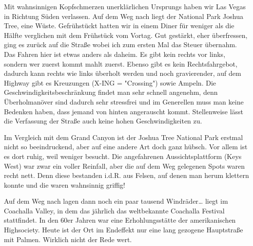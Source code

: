 Mit wahnsinnigen Kopfschmerzen unerklärlichen Ursprungs haben wir Las Vegas in Richtung Süden verlassen.
Auf dem Weg nach  liegt der National Park Joshua Tree, eine Wüste.
Gefrühstückt hatten wir in einem Diner für weniger als die Hälfte verglichen mit dem Frühstück vom Vortag.
Gut gestärkt, eher überfressen, ging es zurück auf die Straße wobei ich zum ersten Mal das Steuer übernahm.
Das Fahren hier ist etwas anders als daheim. Es gibt kein rechts vor links, sondern wer zuerst kommt mahlt zuerst.
Ebenso gibt es kein Rechtsfahrgebot, dadurch kann rechts wie links überholt werden und noch gravierender, auf dem Highway gibt es Kreuzungen (X-ING = "Crossing") sowie Ampeln.
Die Geschwindigkeitsbeschränkung findet man sehr schnell angenehm, denn Überholmanöver sind dadurch sehr stressfrei und im Generellen muss man keine Bedenken haben, dass jemand von hinten angerauscht kommt.
Stellenweise lässt die Verfassung der Straße auch keine hohen Geschwindigkeiten zu.

Im Vergleich mit dem Grand Canyon ist der Joshua Tree National Park erstmal nicht so beeindruckend, aber auf eine andere Art doch ganz hübsch.
Vor allem ist es dort ruhig, weil weniger besucht.
Die angefahrenen Aussichtsplattform (Keys West) war zwar ein voller Reinfall, aber die auf dem Weg gelegenen Spots waren recht nett.
Denn diese bestanden i.d.R. aus Felsen, auf denen man herum klettern konnte und die waren wahnsinnig griffig!

\newpage
\thispagestyle{empty}
\newpage

Auf dem Weg nach  lagen dann noch ein paar tausend Windräder\dots
{} liegt im Coachalla Valley, in dem das jährlich das weltbekannte Coachalla Festival stattfindet.
In den 60er Jahren war  eine Erhohlungsstätte der amerikanischen Highsociety.
Heute ist der Ort im Endeffekt nur eine lang gezogene Hauptstraße mit Palmen.
Wirklich nicht der Rede wert.
